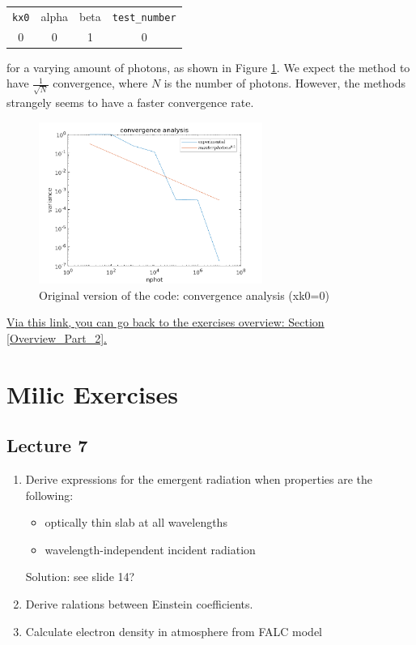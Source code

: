 \documentclass[../main/main.tex]{subfiles}
\begin{document}
\begin{center}
\centering
{\tabulinesep=1.5mm
\begin{tabu}{|c|c|c|c|}
\hline 
\texttt{kx0} & alpha & beta & \texttt{test\_number} \\
0 & 0 & 1 & 0 \\ \hline
\end{tabu}}
\end{center}

for a varying amount of photons, as shown in Figure \ref{Convergence_Pcyg_kx0_0}. We expect the method to have $\frac{1}{\sqrt{N}}$ convergence, where $N$ is the number of photons. However, the methods strangely seems to have a faster convergence rate. \noindent{}


\begin{figure}[!htp]
\centering
\includegraphics[width=0.65\textwidth]{../../introductory_exercises/P_Cygni_profile_UV_resonance/test0_convergence.png}
\caption{Original version of the code: convergence analysis (xk0=0)}
\label{Convergence_Pcyg_kx0_0}
\end{figure}

\underline{Via this link, you can go back to the exercises overview: Section \ref{Overview_Part_2}.}

\newpage
\section{Milic Exercises}
\subsection{Lecture 7}
\begin{enumerate}
\item Derive expressions for the emergent radiation when properties are the following:
\begin{itemize}
\item optically thin slab at all wavelengths
\item wavelength-independent incident radiation
\end{itemize}
Solution: see slide 14?

\item Derive ralations between Einstein coefficients.

\item Calculate electron density in atmosphere from FALC model
\end{enumerate}
\end{document}
